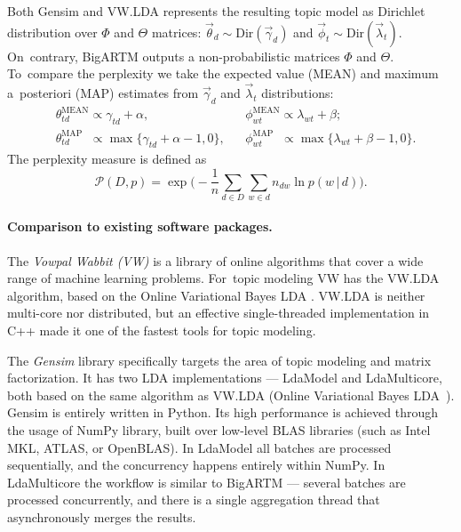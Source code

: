 \documentclass[russian]{llncs}
\newcommand{\cond}{\mspace{3mu}{|}\mspace{3mu}}
\begin{document}
Both Gensim and VW.LDA represents the resulting topic model as Dirichlet distribution over $\Phi$ and $\Theta$ matrices:
$\vec{\theta}_{d} \sim \text{Dir}(\vec{\gamma}_d)$ and
$\vec{\phi}_{t} \sim \text{Dir}(\vec{\lambda}_t)$.
On~contrary, BigARTM outputs a non-probabilistic matrices $\Phi$ and $\Theta$.
To~compare the perplexity we take the expected value (MEAN) and maximum a~posteriori (MAP) estimates
from $\vec{\gamma}_d$ and $\vec{\lambda}_t$ distributions:
\begin{align*}
	& \theta^{\mathrm{MEAN}}_{td} \propto \gamma_{td}+\alpha, &
    & \phi^{\mathrm{MEAN}}_{wt} \propto \lambda_{wt}+\beta;
\\
	& \theta^{\mathrm{MAP}}_{td} \;\; \propto \max\{\gamma_{td}+\alpha-1,0\}, &
    & \phi^{\mathrm{MAP}}_{wt} \;\; \propto \max\{\lambda_{wt}+\beta-1,0\}.
\end{align*}
The perplexity measure is defined as
\begin{equation}
    \label{eq:perplexity}
    \mathscr{P}(D, p) =
        \exp \biggl( - \frac{1}{n} \sum_{d \in D} \sum_{w \in d} n_{dw} \ln p(w \cond d) \biggr).
\end{equation}

\paragraph{Comparison to existing software packages.}

The \emph{Vowpal Wabbit (VW)} is a library
of online algorithms that cover a wide range of machine learning problems. %
For~topic modeling VW has the VW.LDA algorithm, based on the Online Variational Bayes LDA \cite{hoffman10online}.
VW.LDA is neither multi-core nor distributed,
but an effective single-threaded implementation in C++ made it one of the fastest tools for topic modeling.%

The \emph{Gensim} library specifically targets the area of topic modeling and matrix factorization.
It has two LDA implementations --- LdaModel and LdaMulticore,
both based on the same algorithm as VW.LDA (Online Variational Bayes LDA~\cite{hoffman10online}).
Gensim is entirely written in Python. Its high performance is achieved through the usage of NumPy library,
built over low-level BLAS libraries (such as Intel MKL, ATLAS, or OpenBLAS).
In LdaModel all batches are processed sequentially, and the concurrency happens entirely within NumPy. %
In LdaMulticore the workflow is similar to BigARTM --- several batches are processed concurrently, and there is a single aggregation thread that asynchronously merges the results.
\end{document}

